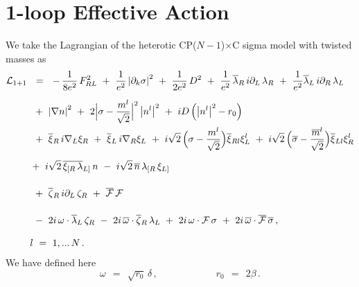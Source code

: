 \documentclass[12pt]{article}
\newcommand{\p}{\partial}
\newcommand{\ov}{\overline}
\newcommand{\mc}[1]{\mathcal{#1}}
\newcommand{\bxir}{\ov{\xi}{}_R}
\newcommand{\bxil}{\ov{\xi}{}_L}
\newcommand{\xir}{\xi_R}
\newcommand{\xil}{\xi_L}
\newcommand{\bzr}{\ov{\zeta}{}_R}
\newcommand{\zr}{\zeta_R}
\newcommand{\nbar}{\ov{n}}
\newcommand{\CPC}{CP($N-1$)$\times$C }
\newcommand{\lar}{\lambda_R}
\newcommand{\lal}{\lambda_L}
\newcommand{\blar}{\ov{\lambda}{}_R}
\newcommand{\blal}{\ov{\lambda}{}_L}
\newcommand{\ff}{\mc{F}}
\newcommand{\bff}{\ov{\mc{F}}}
\begin{document}
%
%
\section{1-loop Effective Action}

We take the Lagrangian of the heterotic \CPC sigma model with twisted masses as
\begin{align}
\label{sigma_full}
% 
\notag
 	\mc{L}_\text{1+1} & ~~=~~
	-\,\frac{1}{8e^2}\,F_{RL}^2  ~+~ \frac{1}{e^2} \left|\p_k \sigma\right|^2 
	~+~ \frac{1}{2e^2}\, D^2
	~+~ \frac{1}{e^2}\, \blar\, i\p_L\, \lar  ~+~  \frac{1}{e^2} \blal\, i\p_R\, \lal
	\\[2mm]
%
\notag
	&~
	~+~ 
	\left| \nabla n \right|^2  ~+~ 2 \Bigl| \sigma - \frac{m^l}{\sqrt 2} \Bigr|^2 \left| n^l \right|^2
	~+~ iD \left( \left|n^l \right|^2 - r_0 \right)
	\\
%
\notag
	&~
	~+~ \bxir\, i\nabla_L \xir  ~+~ \bxil\, i\nabla_R \xil ~+~
	i\sqrt{2}\, \Bigl( \sigma - \frac{m^l}{\sqrt{2}} \Bigr) \ov{\xi}{}_{Rl} \xi_L^l
	~+~ i\sqrt{2}\, \Bigl( \ov{\sigma} - \frac{\ov{m}{}^l}{\sqrt{2}} \Bigr) \ov{\xi}{}_{Ll} \xi_R^l
	\\[2mm]
%
	&
	~+~ i\sqrt{2}\, \ov{\xi_{[R}\, \lambda}{}_{L]}\, n
	~-~ i\sqrt{2}\, \nbar\,  \lambda_{[R}\, \xi_{L]}
	\\[4mm]
%
\notag
	&~
	~+~ \bzr\, i\p_L\, \zr   ~+~   \bff\, \ff
	\\[4mm]
%
\notag
	&~
	~-~ 2i\, \omega \cdot \blal\, \zr
	~-~ 2i\, \ov{\omega} \cdot \bzr\, \lal
	~+~ 2i\, \omega \cdot \ff\, \sigma
	~+~ 2i\, \ov{\omega} \cdot \bff\, \ov{\sigma}\,,
	\\[3mm]
%
\notag
	&~
	l~=~1,...\,N\,.
\end{align}
	We have defined here
\[
	\omega ~~=~~ \sqrt{r_0}\,\delta\,, \qquad\qquad\qquad r_0 ~~=~~ 2\beta\,.
\]
\end{document}
